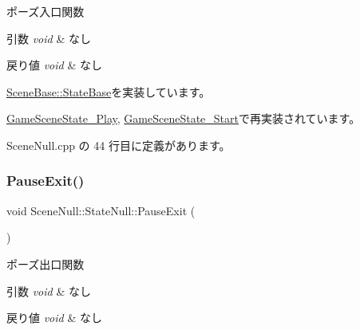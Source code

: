 ポーズ入口関数 


\begin{DoxyParams}{引数}
{\em void} & なし \\
\hline
\end{DoxyParams}

\begin{DoxyRetVals}{戻り値}
{\em void} & なし \\
\hline
\end{DoxyRetVals}


\mbox{\hyperlink{class_scene_base_1_1_state_base_aaf225859597bf99de1062bc55f98530d}{Scene\+Base\+::\+State\+Base}}を実装しています。



\mbox{\hyperlink{class_game_scene_state___play_a3bd935dc9cf71fc77d35a1e9001b0d94}{Game\+Scene\+State\+\_\+\+Play}}, \mbox{\hyperlink{class_game_scene_state___start_a7f1b9f52bfb791622ca589ebd970dade}{Game\+Scene\+State\+\_\+\+Start}}で再実装されています。



 Scene\+Null.\+cpp の 44 行目に定義があります。

\mbox{\label{class_scene_null_1_1_state_null_acf2eecc6ee9f16b57095aa0b88192257}} 
\subsubsection{\texorpdfstring{Pause\+Exit()}{PauseExit()}}
{\footnotesize\ttfamily void Scene\+Null\+::\+State\+Null\+::\+Pause\+Exit (\begin{DoxyParamCaption}{ }\end{DoxyParamCaption})\hspace{0.3cm}{\ttfamily [virtual]}}



ポーズ出口関数 


\begin{DoxyParams}{引数}
{\em void} & なし \\
\hline
\end{DoxyParams}

\begin{DoxyRetVals}{戻り値}
{\em void} & なし \\
\hline
\end{DoxyRetVals}


